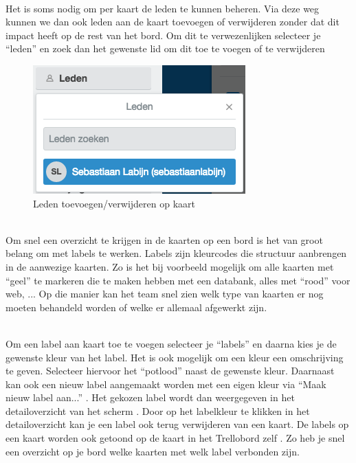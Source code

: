 \label{paragraaf:leden_wijzigen}
\noindent
\\Het is soms nodig om per kaart de leden te kunnen beheren. Via deze weg kunnen we dan ook leden aan de kaart toevoegen of verwijderen zonder dat dit impact heeft op de rest van het bord. Om dit te verwezenlijken selecteer je ``leden'' en zoek dan het gewenste lid om dit toe te voegen of te verwijderen 

\begin{figure}[H]
	\centering
	\includegraphics[scale=0.4]{./afbeeldingen/beheer_leden_kaart.png}
	\caption{Leden toevoegen/verwijderen op kaart}
	\label{fig:beheer_leden_kaart}	
\end{figure} 

\noindent
\\
Om snel een overzicht te krijgen in de kaarten op een bord is het van groot belang om met labels te werken. Labels zijn kleurcodes die structuur aanbrengen in de aanwezige kaarten. Zo is het bij voorbeeld mogelijk om alle kaarten met ``geel'' te markeren die te maken hebben met een databank, alles met ``rood'' voor web, ... Op die manier kan het team snel zien welk type van kaarten er nog moeten behandeld worden of welke er allemaal afgewerkt zijn.

\noindent
\\Om een label aan kaart toe te voegen selecteer je ``labels'' en daarna kies je de gewenste kleur van het label. Het is ook mogelijk om een kleur een omschrijving te geven. Selecteer hiervoor het ``potlood'' naast de gewenste kleur. Daarnaast kan ook een nieuw label aangemaakt worden met een eigen kleur via ``Maak nieuw label aan...'' . Het gekozen label wordt dan weergegeven in het detailoverzicht van het scherm . Door op het labelkleur te klikken in het detailoverzicht kan je een label ook terug verwijderen van een kaart. De labels op een kaart worden ook getoond op de kaart in het Trellobord zelf . Zo heb je snel een overzicht op je bord welke kaarten met welk label verbonden zijn.

